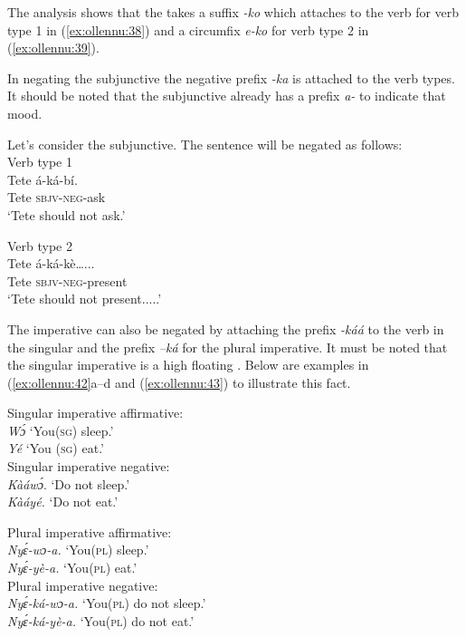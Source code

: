 \documentclass[output=paper,newtxmath,modfonts,nonflat,draftmode]{langsci/langscibook}
\begin{document}
The analysis shows that the  takes a suffix \textit{-ko} which attaches to the verb for verb type 1 in (\ref{ex:ollennu:38}) and a circumfix \textit{e-ko} for verb type 2 in (\ref{ex:ollennu:39}).

In negating the subjunctive the negative prefix \textit{-ka} is attached to the verb types. It should be noted that the subjunctive already has a prefix \textit{a-} to indicate that mood.

Let’s consider the subjunctive. The sentence will be negated as follows:\\



\ea  Verb type 1 \\\label{ex:ollennu:40}
\gll Tete á-ká-bí.\\
Tete \textsc{sbjv}-\textsc{neg}-ask\\
\glt `Tete should not ask.'
\z






\ea  Verb type 2 \\\label{ex:ollennu:41}
\gll Tete á-ká-kè…...\\
Tete \textsc{sbjv}-\textsc{neg}-present\\
\glt `Tete should not present.....'
\z


The imperative can also be negated by attaching the prefix \textit{-káá} to the verb in the singular and the prefix \textit{–ká} for the plural imperative. It must be noted that the singular imperative is a high floating . Below are examples in (\ref{ex:ollennu:42}a--d and (\ref{ex:ollennu:43}) to illustrate this fact.

\ea \label{ex:ollennu:42}
Singular imperative affirmative:\\
\ea \textit{W\'ɔ}   `You(\textsc{sg}) sleep.' \\
\ex \textit{Yé}  `You (\textsc{sg}) eat.'\\
Singular imperative negative:\\
\ex \textit{Kàáw\'ɔ}.  `Do not sleep.' \\
\ex \textit{Kàáyé.}  `Do not eat.'
\z
\z

\ea \label{ex:ollennu:43} Plural imperative affirmative:\\
\ea \textit{Ny\'ɛ-wɔ-a.}  `You(\textsc{pl}) sleep.'\\
\ex  \textit{Ny\'ɛ-yè-a.}  `You(\textsc{pl}) eat.'\\
Plural imperative negative:\\
\ex \textit{Ny\'ɛ-ká-wɔ-a.}  `You(\textsc{pl}) do not sleep.' \\
\ex \textit{Ny\'ɛ-ká-yè-a.}  `You(\textsc{pl}) do not eat.'
\z
\z
\end{document}
